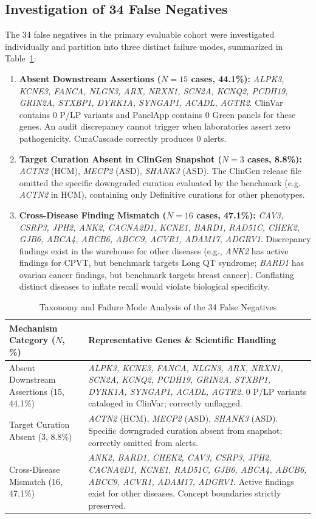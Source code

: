 \documentclass[conference]{IEEEtran}
\begin{document}
\subsection{Investigation of 34 False Negatives}
The 34 false negatives in the primary evaluable cohort were investigated individually and partition into three distinct failure modes, summarized in Table~\ref{tab:fn_breakdown}:
\begin{enumerate}
    \item \textbf{Absent Downstream Assertions ($N = 15$ cases, 44.1\%):}
    \textit{ALPK3, KCNE3, FANCA, NLGN3, ARX, NRXN1, SCN2A, KCNQ2, PCDH19, GRIN2A, STXBP1, DYRK1A, SYNGAP1, ACADL, AGTR2}.
    ClinVar contains 0 P/LP variants and PanelApp contains 0 Green panels for these genes. An audit discrepancy cannot trigger when laboratories assert zero pathogenicity. CuraCascade correctly produces 0 alerts.
    \item \textbf{Target Curation Absent in ClinGen Snapshot ($N = 3$ cases, 8.8\%):}
    \textit{ACTN2} (HCM), \textit{MECP2} (ASD), \textit{SHANK3} (ASD).
    The ClinGen release file omitted the specific downgraded curation evaluated by the benchmark (e.g. \textit{ACTN2} in HCM), containing only Definitive curations for other phenotypes.
    \item \textbf{Cross-Disease Finding Mismatch ($N = 16$ cases, 47.1\%):}
    \textit{CAV3, CSRP3, JPH2, ANK2, CACNA2D1, KCNE1, BARD1, RAD51C, CHEK2, GJB6, ABCA4, ABCB6, ABCC9, ACVR1, ADAM17, ADGRV1}.
    Discrepancy findings exist in the warehouse for other diseases (e.g., \textit{ANK2} has active findings for CPVT, but benchmark targets Long QT syndrome; \textit{BARD1} has ovarian cancer findings, but benchmark targets breast cancer). Conflating distinct diseases to inflate recall would violate biological specificity.
\end{enumerate}

\begin{table}[t]
\caption{Taxonomy and Failure Mode Analysis of the 34 False Negatives}
\label{tab:fn_breakdown}
\centering
\begin{tabularx}{\columnwidth}{lX}
\toprule
\textbf{Mechanism Category ($N$, \%)} & \textbf{Representative Genes \& Scientific Handling} \\
\midrule
Absent Downstream Assertions (15, 44.1\%) & \textit{ALPK3, KCNE3, FANCA, NLGN3, ARX, NRXN1, SCN2A, KCNQ2, PCDH19, GRIN2A, STXBP1, DYRK1A, SYNGAP1, ACADL, AGTR2}. 0 P/LP variants cataloged in ClinVar; correctly unflagged. \\
Target Curation Absent (3, 8.8\%) & \textit{ACTN2} (HCM), \textit{MECP2} (ASD), \textit{SHANK3} (ASD). Specific downgraded curation absent from snapshot; correctly omitted from alerts. \\
Cross-Disease Mismatch (16, 47.1\%) & \textit{ANK2, BARD1, CHEK2, CAV3, CSRP3, JPH2, CACNA2D1, KCNE1, RAD51C, GJB6, ABCA4, ABCB6, ABCC9, ACVR1, ADAM17, ADGRV1}. Active findings exist for other diseases. Concept boundaries strictly preserved. \\
\bottomrule
\end{tabularx}
\end{table}
\end{document}
